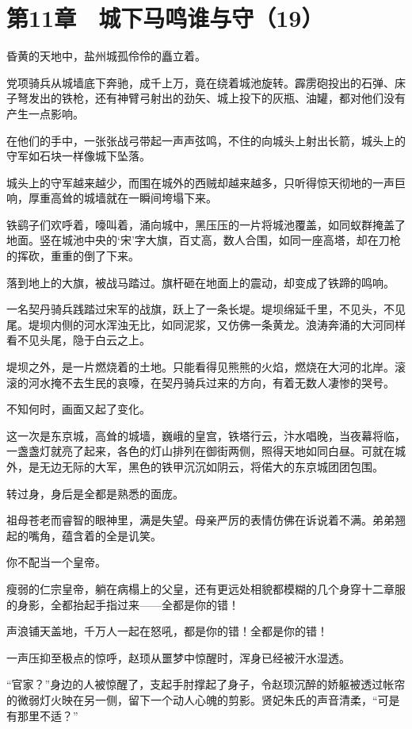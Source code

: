 \section{第11章　城下马鸣谁与守（19）}

昏黄的天地中，盐州城孤伶伶的矗立着。

党项骑兵从城墙底下奔驰，成千上万，竟在绕着城池旋转。霹雳砲投出的石弹、床子弩发出的铁枪，还有神臂弓射出的劲矢、城上投下的灰瓶、油罐，都对他们没有产生一点影响。

在他们的手中，一张张战弓带起一声声弦鸣，不住的向城头上射出长箭，城头上的守军如石块一样像城下坠落。

城头上的守军越来越少，而围在城外的西贼却越来越多，只听得惊天彻地的一声巨响，厚重高耸的城墙就在一瞬间垮塌下来。

铁鹞子们欢呼着，嚎叫着，涌向城中，黑压压的一片将城池覆盖，如同蚁群掩盖了地面。竖在城池中央的‘宋’字大旗，百丈高，数人合围，如同一座高塔，却在刀枪的挥砍，重重的倒了下来。

落到地上的大旗，被战马踏过。旗杆砸在地面上的震动，却变成了铁蹄的鸣响。

一名契丹骑兵践踏过宋军的战旗，跃上了一条长堤。堤坝绵延千里，不见头，不见尾。堤坝内侧的河水浑浊无比，如同泥浆，又仿佛一条黄龙。浪涛奔涌的大河同样看不见头尾，隐于白云之上。

堤坝之外，是一片燃烧着的土地。只能看得见熊熊的火焰，燃烧在大河的北岸。滚滚的河水掩不去生民的哀嚎，在契丹骑兵过来的方向，有着无数人凄惨的哭号。

不知何时，画面又起了变化。

这一次是东京城，高耸的城墙，巍峨的皇宫，铁塔行云，汴水唱晚，当夜幕将临，一盏盏灯就亮了起来，各色的灯山排列在御街两侧，照得天地如同白昼。可就在城外，是无边无际的大军，黑色的铁甲沉沉如阴云，将偌大的东京城团团包围。

转过身，身后是全都是熟悉的面庞。

祖母苍老而睿智的眼神里，满是失望。母亲严厉的表情仿佛在诉说着不满。弟弟翘起的嘴角，蕴含着的全是讥笑。

你不配当一个皇帝。

瘦弱的仁宗皇帝，躺在病榻上的父皇，还有更远处相貌都模糊的几个身穿十二章服的身影，全都抬起手指过来——全都是你的错！

声浪铺天盖地，千万人一起在怒吼，都是你的错！全都是你的错！

一声压抑至极点的惊呼，赵顼从噩梦中惊醒时，浑身已经被汗水湿透。

“官家？”身边的人被惊醒了，支起手肘撑起了身子，令赵顼沉醉的娇躯被透过帐帘的微弱灯火映在另一侧，留下一个动人心魄的剪影。贤妃朱氏的声音清柔，“可是有那里不适？”

